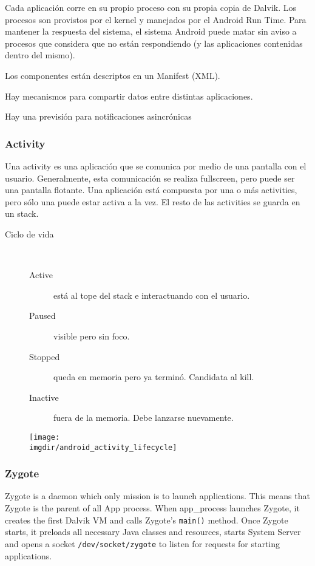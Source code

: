 \documentclass[a4paper, twoside]{article}
\newcommand{\imgdir}{../resources/images} %
\begin{document}
Cada aplicación corre en su propio proceso con su propia copia de Dalvik. Los procesos son provistos por el kernel y manejados por el Android Run Time. Para mantener la respuesta del sistema, el sistema Android puede matar sin aviso a procesos que considera que no están respondiendo (y las aplicaciones contenidas dentro del mismo).

Los componentes están descriptos en un Manifest (XML).

Hay mecanismos para compartir datos entre distintas aplicaciones.

Hay una previsión para notificaciones asincrónicas

\subsubsection{Activity}
Una activity es una aplicación que se comunica por medio de una pantalla con el usuario. Generalmente, esta comunicación se realiza fullscreen, pero puede ser una pantalla flotante. Una aplicación está compuesta por una o más activities, pero sólo una puede estar activa a la vez. El resto de las activities se guarda en un stack.

\begin{description}
	\item[Ciclo de vida] ~
	\begin{description}
		\item[Active] está al tope del stack e interactuando con el usuario.
		\item [Paused] visible pero sin foco.
		\item [Stopped] queda en memoria pero ya terminó. Candidata al kill.
		\item [Inactive] fuera de la memoria. Debe lanzarse nuevamente.
	\end{description}		
\end{description}

\begin{figure}[h]
	\centering
	\texttt{[image: \\imgdir/android\_activity\_lifecycle]}
	\label{fig:android_activity_lifecycle}
\end{figure}

\subsubsection{Zygote}
Zygote is a daemon which only mission is to launch applications. This means that Zygote is the parent of all App process. When app\_process launches Zygote, it creates the first Dalvik VM and calls Zygote's \texttt{main()} method. Once Zygote starts, it preloads all necessary Java classes and resources, starts System Server and opens a socket \texttt{/dev/socket/zygote} to listen for requests for starting applications. 
\end{document}
